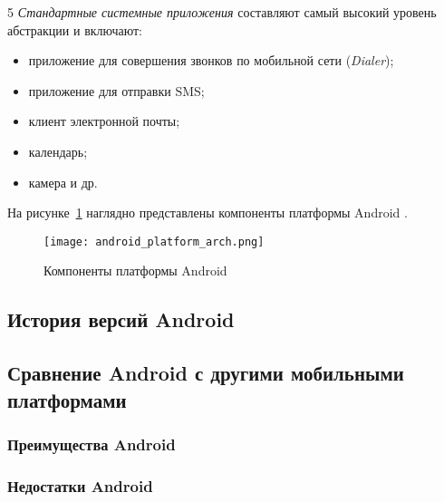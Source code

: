 5 \textit{Стандартные системные приложения} составляют самый высокий уровень абстракции и включают:
\begin{itemize}
	\item приложение для совершения звонков по мобильной сети (\textit{Dialer});
	\item приложение для отправки SMS;
	\item клиент электронной почты;
	\item календарь;
	\item камера и др.
\end{itemize}

На рисунке~\ref{fig:android_platform_arch} наглядно представлены компоненты платформы Android \cite{android_platform_arch}.

\begin{figure}[p]
    \centering
    \texttt{[image: android\_platform\_arch.png]}  
    \caption{Компоненты платформы Android}
	\label{fig:android_platform_arch}
\end{figure}

\subsection{История версий Android}
\label{sub:android_platform:history}

\subsection{Сравнение Android с другими мобильными платформами}
\label{sub:android_platform:history}

\subsubsection{Преимущества Android}
\label{sub:android_platform:history}

\subsubsection{Недостатки Android}
\label{sub:android_platform:history}
